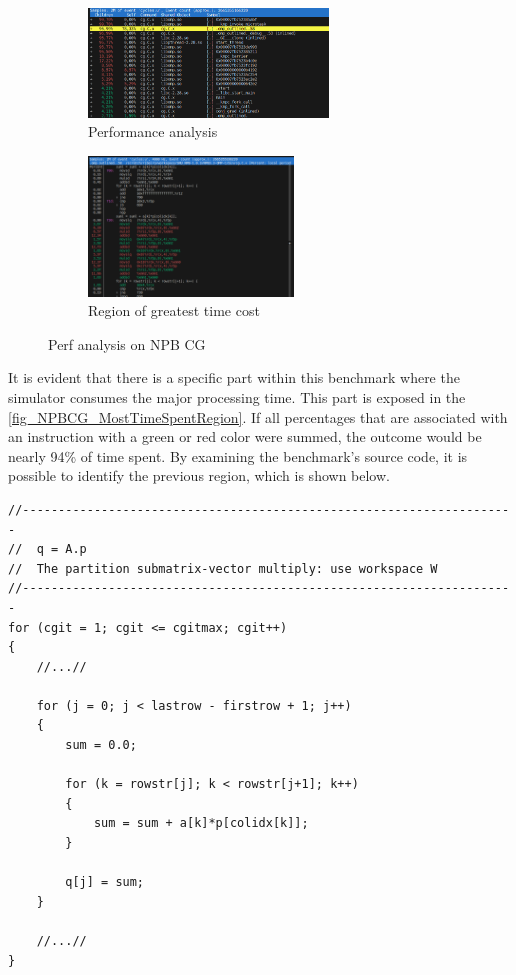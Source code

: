 \begin{figure}[H]
    \begin{subfigure}{\textwidth}
        \centering
        \includegraphics[width=0.7\textwidth]{Images/NPBCG_CycleAnalysis.png}
        \caption{ Performance analysis}
        \label{fig_NPBCG_CycleAnalysis}
    \end{subfigure}
    \begin{subfigure}{\textwidth}
        \centering
        \includegraphics[width=0.6\textwidth]{Images/NPBCG_MostTimeSpentRegion.png}
        \caption{ Region of greatest time cost}
        \label{fig_NPBCG_MostTimeSpentRegion}
    \end{subfigure}
    \caption{Perf analysis on NPB CG}
\end{figure}

It is evident that there is a specific part within this benchmark where the simulator consumes the major processing time. This part is 
exposed in the \autoref{fig_NPBCG_MostTimeSpentRegion}. If all percentages that are associated with an instruction with a green or red color 
were summed, the outcome would be nearly 94\% of time spent. By examining the benchmark's source code, it is possible to identify the previous 
region, which is shown below.


\begin{lstlisting}[style=customC, caption={Snippet source code of NPB CG}, label=CodeNpbCgSnippet]
//---------------------------------------------------------------------
//  q = A.p
//  The partition submatrix-vector multiply: use workspace W
//---------------------------------------------------------------------
for (cgit = 1; cgit <= cgitmax; cgit++) 
{
    //...//

    for (j = 0; j < lastrow - firstrow + 1; j++) 
    {
        sum = 0.0;

        for (k = rowstr[j]; k < rowstr[j+1]; k++) 
        {
            sum = sum + a[k]*p[colidx[k]];
        }

        q[j] = sum;
    }

    //...//
}
\end{lstlisting}

